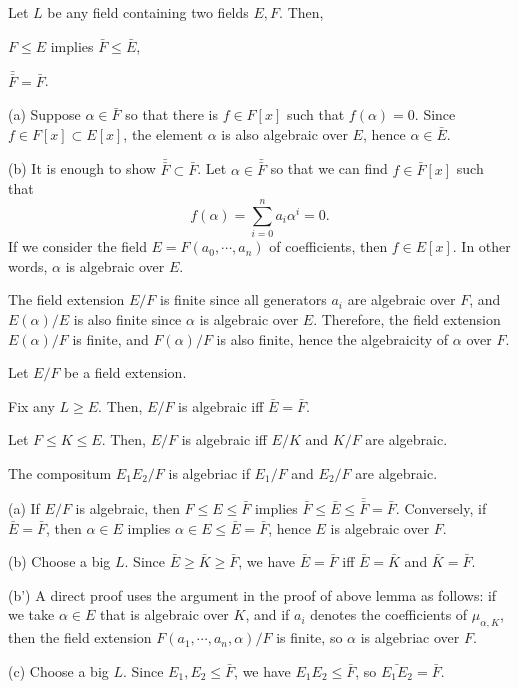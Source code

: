 \documentclass{../note}
\begin{document}
\begin{lem}
Let $L$ be any field containing two fields $E,F$.
Then,
\begin{parts}
\item $F\le E$ implies $\bar F\le \bar E$,
\item $\bar{\bar F}=\bar F$.
\end{parts}
\end{lem}
\begin{pf}
(a)
Suppose $\alpha\in\bar F$ so that there is $f\in F[x]$ such that $f(\alpha)=0$.
Since $f\in F[x]\subset E[x]$, the element $\alpha$ is also algebraic over $E$, hence $\alpha\in\bar E$.

(b)
It is enough to show $\bar{\bar F}\subset\bar F$.
Let $\alpha\in\bar{\bar F}$ so that we can find $f\in\bar F[x]$ such that
\[f(\alpha)=\sum_{i=0}^na_i\alpha^i=0.\]
If we consider the field $E=F(a_0,\cdots,a_n)$ of coefficients, then $f\in E[x]$.
In other words, $\alpha$ is algebraic over $E$.

The field extension $E/F$ is finite since all generators $a_i$ are algebraic over $F$, and $E(\alpha)/E$ is also finite since $\alpha$ is algebraic over $E$.
Therefore, the field extension $E(\alpha)/F$ is finite, and $F(\alpha)/F$ is also finite, hence the algebraicity of $\alpha$ over $F$.
\end{pf}

\begin{thm}
Let $E/F$ be a field extension.
\begin{parts}
\item Fix any $L\ge E$. Then, $E/F$ is algebraic iff $\bar E=\bar F$.
\item Let $F\le K\le E$. Then, $E/F$ is algebraic iff $E/K$ and $K/F$ are algebraic.
\item The compositum $E_1E_2/F$ is algebriac if $E_1/F$ and $E_2/F$ are algebraic.
\end{parts}
\end{thm}
\begin{pf}
(a)
If $E/F$ is algebraic, then $F\le E\le\bar F$ implies $\bar F\le\bar E\le\bar{\bar F}=\bar F$.
Conversely, if $\bar E=\bar F$, then $\alpha\in E$ implies $\alpha\in E\le\bar E=\bar F$, hence $E$ is algebraic over $F$.

(b)
Choose a big $L$.
Since $\bar E\ge\bar K\ge\bar F$, we have $\bar E=\bar F$ iff $\bar E=\bar K$ and $\bar K=\bar F$.

(b')
A direct proof uses the argument in the proof of above lemma as follows: if we take $\alpha\in E$ that is algebraic over $K$, and if $a_i$ denotes the coefficients of $\mu_{\alpha,K}$, then the field extension $F(a_1,\cdots,a_n,\alpha)/F$ is finite, so $\alpha$ is algebriac over $F$.

(c)
Choose a big $L$.
Since $E_1,E_2\le\bar F$, we have $E_1E_2\le\bar F$, so $\bar{E_1E_2}=\bar{F}$.
\end{pf}
\end{document}

